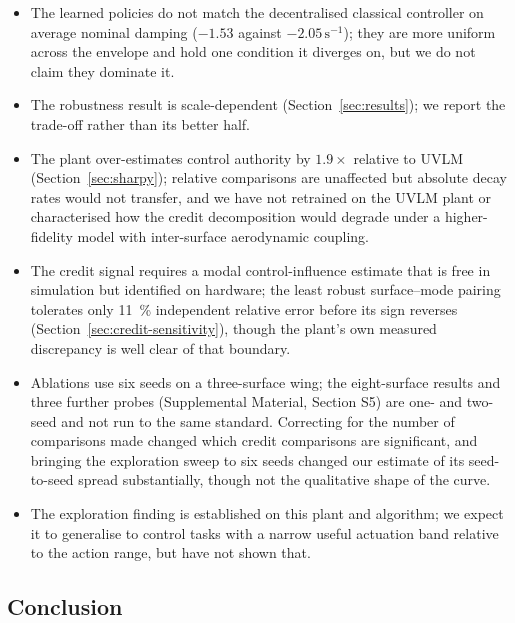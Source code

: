 \documentclass[preprint,11pt]{elsarticle}
\begin{document}
\begin{itemize}
\item The learned policies do not match the decentralised classical
controller on average nominal damping ($-1.53$ against
$-2.05\,\mathrm{s}^{-1}$); they are more uniform across the envelope and
hold one condition it diverges on, but we do not claim they dominate it.
\item The robustness result is scale-dependent (Section~\ref{sec:results});
we report the trade-off rather than its better half.
\item The plant over-estimates control authority by $1.9\times$ relative to
UVLM (Section~\ref{sec:sharpy}); relative comparisons are unaffected but
absolute decay rates would not transfer, and we have not retrained on the
UVLM plant or characterised how the credit decomposition would degrade
under a higher-fidelity model with inter-surface aerodynamic coupling.
\item The credit signal requires a modal control-influence estimate that is
free in simulation but identified on hardware; the least robust
surface--mode pairing tolerates only \SI{11}{\percent} independent
relative error before its sign reverses (Section~\ref{sec:credit-sensitivity}),
though the plant's own measured discrepancy is well clear of that
boundary.
\item Ablations use six seeds on a three-surface wing; the eight-surface
results and three further probes (Supplemental Material, Section S5) are
one- and two-seed and not run to the same standard. Correcting for the
number of
comparisons made changed which credit comparisons are significant, and
bringing the exploration sweep to six seeds changed our estimate of its
seed-to-seed spread substantially, though not the qualitative shape of the
curve.
\item The exploration finding is established on this plant and algorithm;
we expect it to generalise to control tasks with a narrow useful actuation
band relative to the action range, but have not shown that.
\end{itemize}

\subsection{Conclusion}
\end{document}

